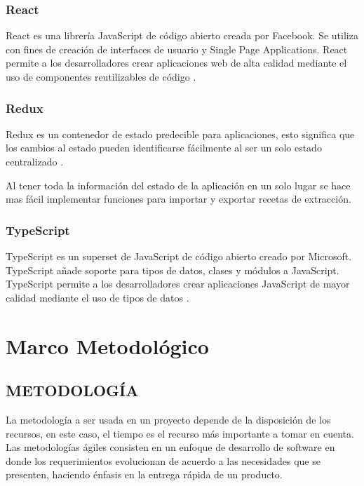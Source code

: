 \documentclass[12pt]{report}
\begin{document}
\subsection{React}

React es una librería JavaScript de código abierto creada por Facebook. Se utiliza con fines de creación de interfaces de usuario y Single Page Applications. React permite a los desarrolladores crear aplicaciones web de alta calidad mediante el uso de componentes reutilizables de código \cite{aggarwal2018modern}.

\subsection{Redux}

Redux es un contenedor de estado predecible para aplicaciones, esto significa que los cambios al estado pueden identificarse fácilmente al ser un solo estado centralizado \cite{caspers2017react} .

Al tener toda la información del estado de la aplicación en un solo lugar se hace mas fácil implementar funciones para importar y exportar recetas de extracción.

\subsection{TypeScript}

TypeScript es un superset de JavaScript de código abierto creado por Microsoft. TypeScript añade soporte para tipos de datos, clases y módulos a JavaScript. TypeScript permite a los desarrolladores crear aplicaciones JavaScript de mayor calidad mediante el uso de tipos de datos \cite{typescript2022}.


\chapter{Marco Metodológico}

\section[Metodología]{METODOLOGÍA}

La metodología a ser usada en un proyecto depende de la disposición de los recursos, en este caso, el tiempo es el recurso más importante a tomar en cuenta. Las metodologías ágiles consisten en un enfoque de desarrollo de software en donde los requerimientos evolucionan de acuerdo a las necesidades que se presenten, haciendo énfasis en la entrega rápida de un producto.
\end{document}
